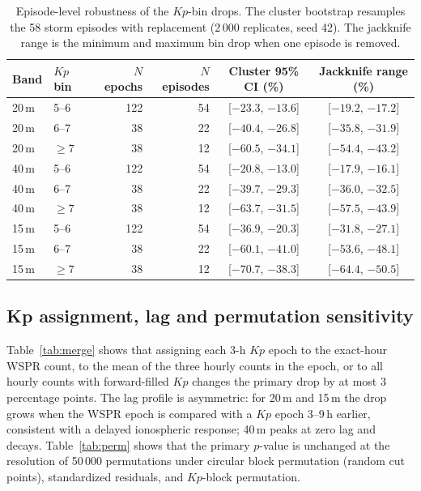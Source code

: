 \documentclass{agujournal2019}
\begin{document}
\begin{table}[h]
	\centering
	\small
	\caption{Episode-level robustness of the $Kp$-bin drops. The cluster
		bootstrap resamples the 58 storm episodes with replacement
		(2\,000 replicates, seed 42). The jackknife range is the minimum
		and maximum bin drop when one episode is removed.}
	\label{tab:episode}
	\begin{tabular}{llrrcc}
		\toprule
		Band & $Kp$ bin & $N$ epochs & $N$ episodes
		& Cluster 95\% CI (\%) & Jackknife range (\%) \\
		\midrule
		20\,m & 5--6 & 122 & 54 & [$-23.3$, $-13.6$] & [$-19.2$, $-17.2$] \\
		20\,m & 6--7 & 38  & 22 & [$-40.4$, $-26.8$] & [$-35.8$, $-31.9$] \\
		20\,m & $\ge 7$ & 38 & 12 & [$-60.5$, $-34.1$] & [$-54.4$, $-43.2$] \\
		40\,m & 5--6 & 122 & 54 & [$-20.8$, $-13.0$] & [$-17.9$, $-16.1$] \\
		40\,m & 6--7 & 38  & 22 & [$-39.7$, $-29.3$] & [$-36.0$, $-32.5$] \\
		40\,m & $\ge 7$ & 38 & 12 & [$-63.7$, $-31.5$] & [$-57.5$, $-43.9$] \\
		15\,m & 5--6 & 122 & 54 & [$-36.9$, $-20.3$] & [$-31.8$, $-27.1$] \\
		15\,m & 6--7 & 38  & 22 & [$-60.1$, $-41.0$] & [$-53.6$, $-48.1$] \\
		15\,m & $\ge 7$ & 38 & 12 & [$-70.7$, $-38.3$] & [$-64.4$, $-50.5$] \\
		\bottomrule
	\end{tabular}
\end{table}

\subsection{Kp assignment, lag and permutation sensitivity}

Table~\ref{tab:merge} shows that assigning each 3-h $Kp$ epoch to the
exact-hour WSPR count, to the mean of the three hourly counts in the epoch,
or to all hourly counts with forward-filled $Kp$ changes the primary drop by
at most 3 percentage points. The lag profile is asymmetric: for 20\,m and
15\,m the drop grows when the WSPR epoch is compared with a $Kp$ epoch 3--9\,h
earlier, consistent with a delayed ionospheric response; 40\,m peaks at zero
lag and decays. Table~\ref{tab:perm} shows that the primary $p$-value is
unchanged at the resolution of 50\,000 permutations under circular block
permutation (random cut points), standardized residuals, and $Kp$-block
permutation.
\end{document}

